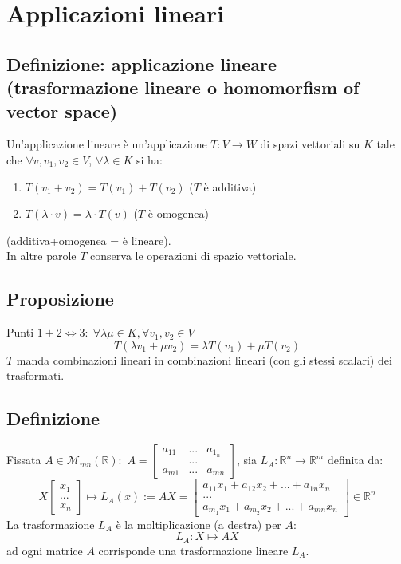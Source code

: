 \section{Applicazioni lineari}
\subsection{Definizione: applicazione lineare (trasformazione lineare o homomorfism of vector space)}
Un'applicazione lineare è un'applicazione $T:V\rightarrow W$ di spazi vettoriali su $K$ tale che $\forall v,v_1,v_2\in V$, $\forall\lambda\in K$ si ha:
\begin{enumerate}
	\item $T(v_1+v_2)=T(v_1)+T(v_2)$ ($T$ è additiva)
	\item $T(\lambda\cdot v)=\lambda\cdot T(v)$ ($T$ è omogenea)
\end{enumerate}
(additiva+omogenea = è lineare).
\\In altre parole $T$ conserva le operazioni di spazio vettoriale.

\subsection{Proposizione}
Punti $1+2\Leftrightarrow 3:\; \forall\lambda\mu\in K,\forall v_1,v_2\in V$
\[T(\lambda v_1+\mu v_2)=\lambda T(v_1)+\mu T(v_2)\]
$T$ manda combinazioni lineari in combinazioni lineari (con gli stessi scalari) dei trasformati.

\subsection{Definizione}
Fissata $A\in \mathcal{M}_{mn}(\mathbb{R}):$ 
$A=\begin{bmatrix}a_{11}&...&a_{1_n}\\&...&\\a_{m1}&...&a_{mn}\end{bmatrix}$, sia $L_A:\mathbb{R}^n\rightarrow\mathbb{R}^m$ definita da:
\[X\begin{bmatrix}x_1\\...\\x_n\end{bmatrix}\mapsto L_A(x):=AX=\begin{bmatrix} a_{11}x_1+a_{12}x_2+...+a_{1n}x_n\\...\\a_{m_1}x_1+a_{m_2}x_2+...+a_{mn}x_n\end{bmatrix}\in\mathbb{R}^n\]
La trasformazione $L_A$ è la moltiplicazione (a destra) per $A$:
\[L_A:X\mapsto AX\]
ad ogni matrice $A$ corrisponde una trasformazione lineare $L_A$.

